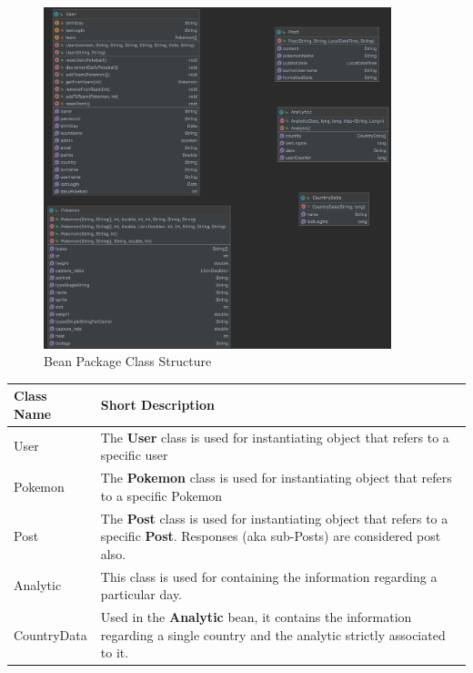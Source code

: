 \begin{figure}[H]
	\centering
	\includegraphics[width=0.9\textwidth]{img/bean_package.png}
	\caption{Bean Package Class Structure}
\end{figure}

\begingroup
\setlength{\tabcolsep}{10pt} %
\renewcommand{\arraystretch}{1.5} %
\begin{center}
	\begin{longtable}{| m{9em} | m{22em} |} 
		\hline
		\textbf{Class Name} & \textbf{Short Description} \\ [0.5ex] 
		\hline
		User & The \textbf{User} class is used for instantiating object that refers to a specific user\\ 
		\hline
		Pokemon & The \textbf{Pokemon} class is used for instantiating object that refers to a specific Pokemon\\
		\hline
		Post & The \textbf{Post} class is used for instantiating object that refers to a specific \textbf{Post}. Responses (aka sub-Posts) are considered post also.\\
		\hline
		Analytic & This class is used for containing the information regarding a particular day.\\
		\hline
		CountryData & Used in the \textbf{Analytic} bean, it contains the information regarding a single country and the analytic strictly associated to it.\\
		\hline
	\end{longtable}
\end{center}
\endgroup

